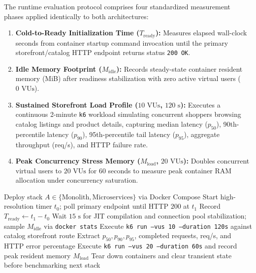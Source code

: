 The runtime evaluation protocol comprises four standardized measurement phases applied identically to both architectures:
\begin{enumerate}[leftmargin=1.5em]
  \item \textbf{Cold-to-Ready Initialization Time ($T_{\text{ready}}$):} Measures elapsed wall-clock seconds from container startup command invocation until the primary storefront/catalog HTTP endpoint returns status \texttt{200 OK}.
  \item \textbf{Idle Memory Footprint ($M_{\text{idle}}$):} Records steady-state container resident memory (MiB) after readiness stabilization with zero active virtual users ($0\text{ VUs}$).
  \item \textbf{Sustained Storefront Load Profile ($10\text{ VUs}$, $120\text{ s}$):} Executes a continuous 2-minute \texttt{k6} workload simulating concurrent shoppers browsing catalog listings and product details, capturing median latency ($p_{50}$), 90th-percentile latency ($p_{90}$), 95th-percentile tail latency ($p_{95}$), aggregate throughput (req/s), and HTTP failure rate.
  \item \textbf{Peak Concurrency Stress Memory ($M_{\text{load}}$, $20\text{ VUs}$):} Doubles concurrent virtual users to $20\text{ VUs}$ for 60 seconds to measure peak container RAM allocation under concurrency saturation.
\end{enumerate}

\begin{algorithm}[h]
  \caption{Reproducible Benchmark Execution Protocol for Architecture $A$}
  \label{alg:benchmark}
  \begin{algorithmic}[1]
    \State Deploy stack $A \in \{\text{Monolith}, \text{Microservices}\}$ via Docker Compose
    \State Start high-resolution timer $t_0$; poll primary endpoint until HTTP $200$ at $t_1$
    \State Record $T_{\text{ready}} \gets t_1 - t_0$
    \State Wait $15\text{ s}$ for JIT compilation and connection pool stabilization; sample $M_{\text{idle}}$ via \texttt{docker stats}
    \State Execute \texttt{k6 run --vus 10 --duration 120s} against catalog storefront route
    \State Extract $p_{50}, p_{90}, p_{95}$, completed requests, req/s, and HTTP error percentage
    \State Execute \texttt{k6 run --vus 20 --duration 60s} and record peak resident memory $M_{\text{load}}$
    \State Tear down containers and clear transient state before benchmarking next stack
  \end{algorithmic}
\end{algorithm}

